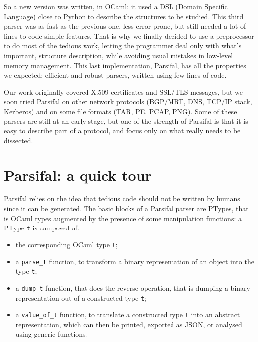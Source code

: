 \documentclass[conference]{IEEEtran}
\begin{document}
So a new version was written, in OCaml: it used a DSL (Domain Specific
Language) close to Python to describe the structures to be
studied. This third parser was as fast as the previous one, less
error-prone, but still needed a lot of lines to code simple
features. That is why we finally decided to use a preprocessor to do
most of the tedious work, letting the programmer deal only with what's
important, structure description, while avoiding usual mistakes in low-level memory management. This last implementation, Parsifal,
has all the properties we expected: efficient and robust parsers,
written using few lines of code.

Our work originally covered X.509 certificates and SSL/TLS messages,
but we soon tried Parsifal on other network protocols (BGP/MRT, DNS,
TCP/IP stack, Kerberos) and on some file formats (TAR, PE, PCAP,
PNG). Some of these parsers are still at an early stage, but one of
the strength of Parsifal is that it is easy to describe part of a
protocol, and focus only on what really needs to be dissected.



\section{Parsifal: a quick tour}

Parsifal relies on the idea that tedious code should not be written by
humans since it can be generated. The basic blocks of a Parsifal
parser are PTypes, that is OCaml types augmented by the presence of
some manipulation functions: a PType \texttt{t} is composed of:
\begin{itemize}
\item the corresponding OCaml type \texttt{t};
\item a \texttt{parse\_t} function, to transform a binary
  representation of an object into the type \texttt{t};
\item a \texttt{dump\_t} function, that does the reverse operation,
  that is dumping a binary representation out of a constructed type
  \texttt{t};
\item a \texttt{value\_of\_t} function, to translate a constructed
  type \texttt{t} into an abstract representation, which can then be
  printed, exported as JSON, or analysed using generic functions.
\end{itemize}
\end{document}
